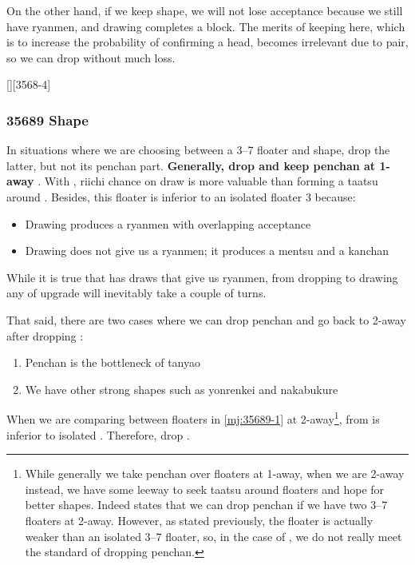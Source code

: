 \documentclass[12pt]{article}
\newlength\stdbls %
\newcommand{\mjfn}[1]{\raisebox{-.135\stdbls}{\mahjong[0.75\stdbls]{#1}}}
\begin{document}
On the other hand, if we keep  shape, we will not lose  acceptance because we still have  ryanmen, and drawing  completes a block. The merits of keeping  here, which is to increase the probability of confirming a head, becomes irrelevant due to  pair, so we can drop  without much loss.

[][3568-4]


\subsubsection{35689 Shape}

In situations where we are choosing between a 3--7 floater and  shape, drop the latter, but not its penchan part. \textbf{Generally, drop  and keep penchan at 1-away} \citep{yuusee-35689}. With , riichi chance on  draw is more valuable than forming a taatsu around . Besides, this floater  is inferior to an isolated floater 3 because:

\begin{itemize}
\item Drawing  produces a ryanmen with overlapping acceptance
\item Drawing  does not give us a ryanmen; it produces a mentsu  and a kanchan 
\end{itemize}

While it is true that  has  draws that give us ryanmen, from dropping  to drawing any of  upgrade will inevitably take a couple of turns.

That said, there are two cases where we can drop penchan  and go back to 2-away after dropping :

\begin{enumerate}
\item Penchan is the bottleneck of tanyao
\item We have other strong shapes such as yonrenkei and nakabukure
\end{enumerate}

When we are comparing between floaters in \ref{mj:35689-1} at 2-away\footnote{While generally we take penchan over floaters at 1-away, when we are 2-away instead, we have some leeway to seek taatsu around floaters and hope for better shapes. Indeed \citet{yuusee-389} states that we can drop penchan if we have two 3--7 floaters at 2-away. However, as stated previously, the \mjfn{3p} floater is actually weaker than an isolated 3--7 floater, so, in the case of \mjfn{35689p}, we do not really meet the standard of dropping penchan.},  from  is inferior to isolated . Therefore, drop .
\end{document}
